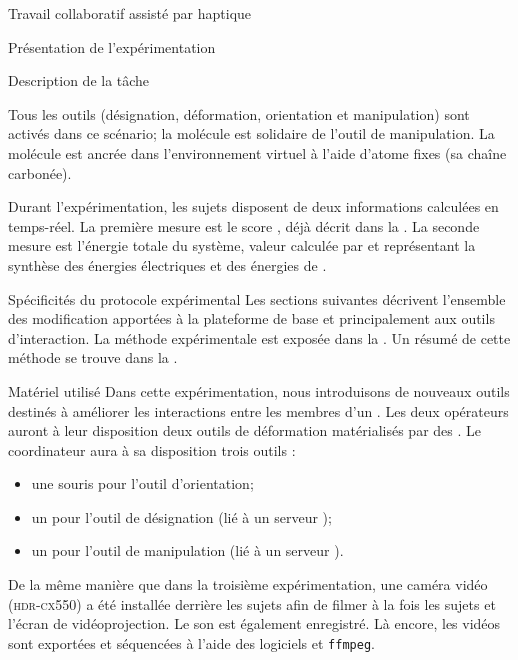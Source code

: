 \documentclass[myfrancais,ngerman,english,french]{mythesis}
\begin{document}
\begin{mychapter}{Travail collaboratif assisté par haptique}
\begin{mysection}{Présentation de l'expérimentation}
\begin{mysubsection}{Description de la tâche}
\begin{description}
						Tous les outils (désignation, déformation, orientation et manipulation) sont activés dans ce scénario; la molécule \myNusG est solidaire de l'outil de manipulation.
						La molécule \myNusE est ancrée dans l'environnement virtuel à l'aide d'atome fixes (sa chaîne carbonée).
				\end{description}

				Durant l'expérimentation, les sujets disposent de deux informations calculées en temps-réel.
				La première mesure est le score , déjà décrit dans la .
				La seconde mesure est l'énergie totale du système, valeur calculée par  et représentant la synthèse des énergies électriques et des énergies de .
			\end{mysubsection}
			\begin{mysubsection}{Spécificités du protocole expérimental}
				Les sections suivantes décrivent l'ensemble des modification apportées à la plateforme de base  et principalement aux outils d'interaction.
				La méthode expérimentale est exposée dans la .
				Un résumé de cette méthode se trouve dans la .
				\begin{mysubsubsection}{Matériel utilisé}
					Dans cette expérimentation, nous introduisons de nouveaux outils destinés à améliorer les interactions entre les membres d'un .
					Les deux opérateurs auront à leur disposition deux outils de déformation matérialisés par des \myOmni.
					Le coordinateur aura à sa disposition trois outils :
					\begin{itemize}
						\item une souris \myUSB pour l'outil d'orientation;
						\item un \myOmni pour l'outil de désignation (lié à un serveur );
						\item un \myDesktop pour l'outil de manipulation (lié à un serveur ).
					\end{itemize}

					De la même manière que dans la troisième expérimentation, une caméra vidéo \mySony (\textsc{hdr-cx550}) a été installée derrière les sujets afin de filmer à la fois les sujets et l'écran de vidéoprojection.
					Le son est également enregistré.
					Là encore, les vidéos sont exportées et séquencées \myafortiori à l'aide des logiciels \myiMovie et \texttt{ffmpeg}.


\end{mysubsubsection}
\end{mysubsection}
\end{mysection}
\end{mychapter}
\end{document}
